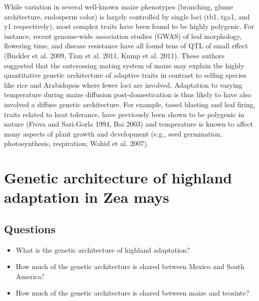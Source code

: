 While variation in several well-known maize phenotypes (branching, glume architecture, endosperm color) is largely controlled by single loci (tb1, tga1, and y1 respectively), most complex traits have been found to be highly polygenic.  For instance, recent genome-wide association studies (GWAS) of leaf morphology, flowering time, and disease resistance have all found tens of QTL of small effect (Buckler et al. 2009, Tian et al. 2011, Kump et al. 2011).  These authors suggested that the outcrossing mating system of maize may explain the highly quantitative genetic architecture of adaptive traits in contrast to selfing species like rice and Arabidopsis where fewer loci are involved.  Adaptation to varying temperature during maize diffusion post-domestication is thus likely to have also involved a diffuse genetic architecture.  For example, tassel blasting and leaf firing, traits related to heat tolerance, have previously been shown to be polygenic in nature (Frova and Sari-Gorla 1994, Bai 2003) and temperature is known to affect many aspects of plant growth and development (e.g., seed germination, photosynthesis, respiration; Wahid et al. 2007).  

\section{Genetic architecture of highland adaptation in Zea mays}

\subsection{Questions}
\begin{itemize}
\item What is the genetic architecture of highland adaptation?
\item How much of the genetic architecture is shared between Mexico and South America?
\item How much of the genetic architecture is shared between maize and teosinte?
\end{itemize}

